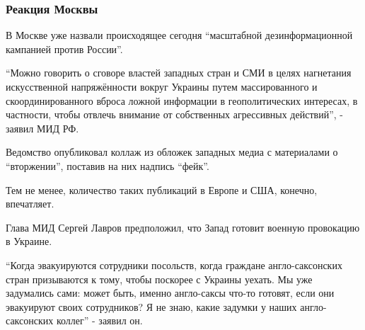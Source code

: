  
 
 
 
 

\subsubsection{Реакция Москвы}
\label{sec:12_02_2022.stz.news.ua.strana.1.vojna_nachnetsja_15_fevralja.2.reakcia_moskvy}

В Москве уже назвали происходящее сегодня \enquote{масштабной дезинформационной
кампанией против России}.  

\enquote{Можно говорить о сговоре властей западных стран и СМИ в целях нагнетания
искусственной напряжённости вокруг Украины путем массированного и
скоординированного вброса ложной информации в геополитических интересах, в
частности, чтобы отвлечь внимание от собственных агрессивных действий}, -
заявил МИД РФ.

Ведомство опубликовал коллаж из обложек западных медиа с материалами о
\enquote{вторжении}, поставив на них надпись \enquote{фейк}. 

Тем не менее, количество таких публикаций в Европе и США, конечно, впечатляет.


Глава МИД Сергей Лавров предположил, что Запад готовит военную провокацию в
Украине.

\enquote{Когда эвакуируются сотрудники посольств, когда граждане
англо-саксонских стран призываются к тому, чтобы поскорее с Украины уехать. Мы
уже задумались сами: может быть, именно англо-саксы что-то готовят, если они
эвакуируют своих сотрудников? Я не знаю, какие задумки у наших англо-саксонских
коллег} - заявил он.


